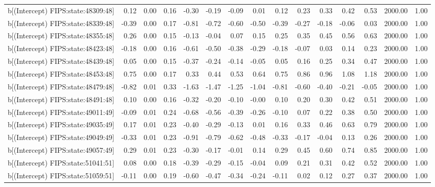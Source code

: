\begin{table}[ht]
\begin{tabular}{rrrrrrrrrrrrrrr}
  b[(Intercept) FIPS:state:48309:48] & 0.12 & 0.00 & 0.16 & -0.30 & -0.19 & -0.09 & 0.01 & 0.12 & 0.23 & 0.33 & 0.42 & 0.53 & 2000.00 & 1.00 \\ 
  b[(Intercept) FIPS:state:48339:48] & -0.39 & 0.00 & 0.17 & -0.81 & -0.72 & -0.60 & -0.50 & -0.39 & -0.27 & -0.18 & -0.06 & 0.03 & 2000.00 & 1.00 \\ 
  b[(Intercept) FIPS:state:48355:48] & 0.26 & 0.00 & 0.15 & -0.13 & -0.04 & 0.07 & 0.15 & 0.25 & 0.35 & 0.45 & 0.56 & 0.63 & 2000.00 & 1.00 \\ 
  b[(Intercept) FIPS:state:48423:48] & -0.18 & 0.00 & 0.16 & -0.61 & -0.50 & -0.38 & -0.29 & -0.18 & -0.07 & 0.03 & 0.14 & 0.23 & 2000.00 & 1.00 \\ 
  b[(Intercept) FIPS:state:48439:48] & 0.05 & 0.00 & 0.15 & -0.37 & -0.24 & -0.14 & -0.05 & 0.05 & 0.16 & 0.25 & 0.34 & 0.47 & 2000.00 & 1.00 \\ 
  b[(Intercept) FIPS:state:48453:48] & 0.75 & 0.00 & 0.17 & 0.33 & 0.44 & 0.53 & 0.64 & 0.75 & 0.86 & 0.96 & 1.08 & 1.18 & 2000.00 & 1.00 \\ 
  b[(Intercept) FIPS:state:48479:48] & -0.82 & 0.01 & 0.33 & -1.63 & -1.47 & -1.25 & -1.04 & -0.81 & -0.60 & -0.40 & -0.21 & -0.05 & 2000.00 & 1.00 \\ 
  b[(Intercept) FIPS:state:48491:48] & 0.10 & 0.00 & 0.16 & -0.32 & -0.20 & -0.10 & -0.00 & 0.10 & 0.20 & 0.30 & 0.42 & 0.51 & 2000.00 & 1.00 \\ 
  b[(Intercept) FIPS:state:49011:49] & -0.09 & 0.01 & 0.24 & -0.68 & -0.56 & -0.39 & -0.26 & -0.10 & 0.07 & 0.22 & 0.38 & 0.50 & 2000.00 & 1.00 \\ 
  b[(Intercept) FIPS:state:49035:49] & 0.17 & 0.01 & 0.23 & -0.40 & -0.29 & -0.13 & 0.01 & 0.16 & 0.33 & 0.46 & 0.63 & 0.79 & 2000.00 & 1.00 \\ 
  b[(Intercept) FIPS:state:49049:49] & -0.33 & 0.01 & 0.23 & -0.91 & -0.79 & -0.62 & -0.48 & -0.33 & -0.17 & -0.04 & 0.13 & 0.26 & 2000.00 & 1.00 \\ 
  b[(Intercept) FIPS:state:49057:49] & 0.29 & 0.01 & 0.23 & -0.30 & -0.17 & -0.01 & 0.14 & 0.29 & 0.45 & 0.60 & 0.74 & 0.85 & 2000.00 & 1.00 \\ 
  b[(Intercept) FIPS:state:51041:51] & 0.08 & 0.00 & 0.18 & -0.39 & -0.29 & -0.15 & -0.04 & 0.09 & 0.21 & 0.31 & 0.42 & 0.52 & 2000.00 & 1.00 \\ 
  b[(Intercept) FIPS:state:51059:51] & -0.11 & 0.00 & 0.19 & -0.60 & -0.47 & -0.34 & -0.24 & -0.11 & 0.02 & 0.12 & 0.27 & 0.37 & 2000.00 & 1.00 \\ 

\end{tabular}
\end{table}
